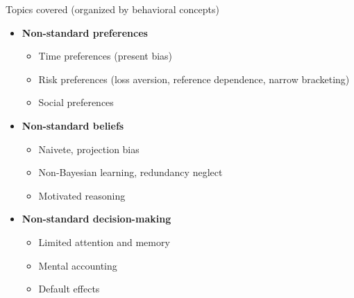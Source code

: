 \documentclass[aspectratio=169, 10pt, handout]{beamer}
\begin{document}
\begin{frame}{Topics covered (organized by behavioral concepts)}

\begin{itemize}

	\item \textbf{Non-standard preferences}

	\begin{itemize}

		\item Time preferences (present bias) 
	
		\item Risk preferences (loss aversion, reference dependence, narrow bracketing)
		
		\item Social preferences

	\end{itemize}
	
	\smallskip
	
	\item \textbf{Non-standard beliefs}
	
	\begin{itemize}

		\item Naivete, projection bias
		
		\item Non-Bayesian learning, redundancy neglect
			
		\item Motivated reasoning

	\end{itemize}
	
		\smallskip

	\item \textbf{Non-standard decision-making}
	
	\begin{itemize}
			
		\item Limited attention and memory
		
		\item Mental accounting
		
		\item Default effects 


	\end{itemize}


\end{itemize}

\end{frame}
\end{document}
